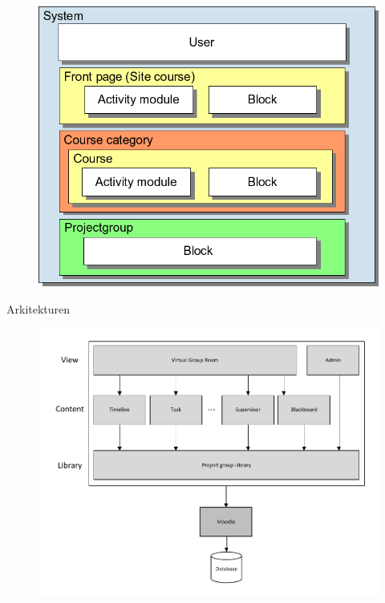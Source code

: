 \begin{frame}{\implementaras}{\topicthreee}
\begin{figure}
\includegraphics[width=\columnwidth]{input/rasmus/Moodle-contexts-mymoodle.png}
\end{figure}
\end{frame}


\begin{frame}{\implementaras}{Arkitekturen}
\begin{figure}%
\includegraphics[width=\columnwidth]{input/assets/architecture}%
\end{figure}	
\end{frame}